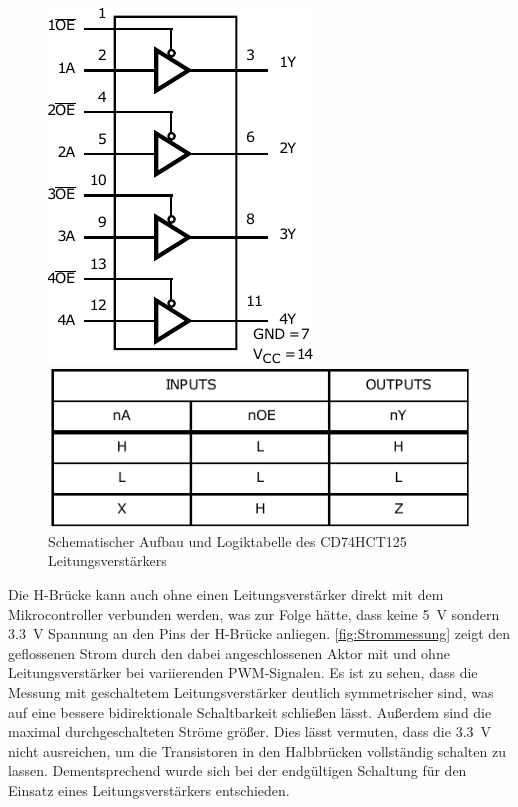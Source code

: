 \begin{figure}[H]
	\begin{center}
		\noindent\begin{minipage}[h!]{0.45\textwidth} %
			\centering
			\includegraphics[height=0.85\textwidth]{Bilder/buffer.pdf}
		\end{minipage} %
		\quad
		\begin{minipage}[h!]{0.45\textwidth} %
			\centering
			\includegraphics[height=0.3\textwidth]{Bilder/tabelle.pdf}
		\end{minipage} %
	\end{center}
	\caption{Schematischer Aufbau und Logiktabelle des CD74HCT125 Leitungsverstärkers \cite[S.2]{Buffer}}
	\label{fig:buffer}
\end{figure}\noindent
Die H-Brücke kann auch ohne einen Leitungsverstärker direkt mit dem Mikrocontroller verbunden werden, was zur Folge hätte, dass keine \SI{5}{V} sondern \SI{3,3}{V} Spannung an den Pins der H-Brücke anliegen. \autoref{fig:Strommessung} zeigt den geflossenen Strom durch den dabei angeschlossenen Aktor mit und ohne Leitungsverstärker bei variierenden PWM-Signalen. Es ist zu sehen, dass die Messung mit geschaltetem Leitungsverstärker deutlich symmetrischer sind, was auf eine bessere bidirektionale Schaltbarkeit schließen lässt. Außerdem sind die maximal durchgeschalteten Ströme größer. Dies lässt vermuten, dass die \SI{3,3}{V} nicht ausreichen, um die Transistoren in den Halbbrücken vollständig schalten zu lassen. Dementsprechend wurde sich bei der endgültigen Schaltung für den Einsatz eines Leitungsverstärkers entschieden. 

